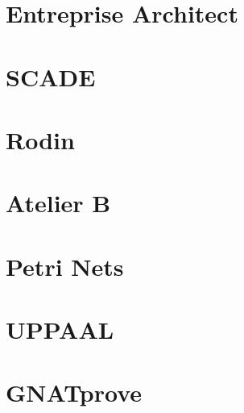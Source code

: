 \documentclass{template/openetcs_report}
\begin{document}
\chapter{Entreprise Architect}
\tbd

\chapter{SCADE}
\tbd

\chapter{Rodin }
\tbd

\chapter{Atelier B }
\tbd

\chapter{Petri Nets}
\tbd

\chapter{UPPAAL}
\tbd

\chapter{GNATprove}
\tbd



\nocite{*}









\end{document}
